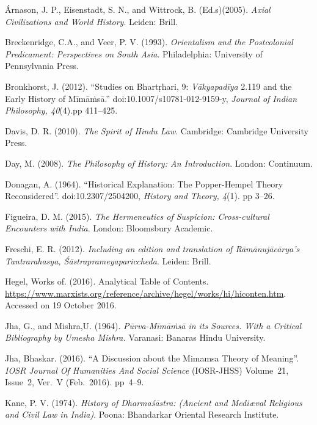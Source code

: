 \begin{thebibliography}{99}
\itemsep=2pt
 Árnason, J. P., Eisenstadt, S. N., and Wittrock, B. (Ed.s)(2005). \textit{Axial Civilizations and World History}. Leiden: Brill.

  Breckenridge, C.A., and Veer, P. V. (1993). \textit{Orientalism and the Postcolonial Predicament: Perspectives on South Asia}. Philadelphia: University of Pennsylvania Press.

  Bronkhorst, J. (2012). “Studies on Bhartṛhari, 9: \textit{Vākyapadīya} 2.119 and the Early History of Mīmāṁsā.” doi:10.1007/s10781-012-9159-y, \textit{Journal of Indian Philosophy, 40}(4).pp 411--425.

  Davis, D. R. (2010). \textit{The Spirit of Hindu Law}. Cambridge: Cambridge University Press.

  Day, M. (2008). \textit{The Philosophy of History: An Introduction}. London: Continuum.

  Donagan, A. (1964). “Historical Explanation: The Popper-Hempel Theory Reconsidered”. doi:10.2307/2504200, \textit{History and Theory, 4}(1). pp 3--26.

  Figueira, D. M. (2015). \textit{The Hermeneutics of Suspicion: Cross-cultural Encounters with India}. London: Bloomsbury Academic.

  Freschi, E. R. (2012). \textit{Including an edition and translation of Rāmānujācārya's Tantrarahasya, Śāstraprameyapariccheda}. Leiden: Brill.

  Hegel, Works of. (2016). Analytical Table of Contents. \url{https://www.marxists.org/reference/archive/hegel/works/hi/hiconten.htm}. Accessed on 19 October 2016.

  Jha, G., and Mishra,U. (1964). \textit{Pūrva-Mīmāṁsā in its Sources. With a Critical Bibliography by Umesha Mishra.} Varanasi: Banaras Hindu University.

  Jha, Bhaskar. (2016). “A Discussion about the Mimamsa Theory of Meaning”. \textit{IOSR Journal Of Humanities And Social Science} (IOSR-JHSS) Volume~21, Issue~2, Ver.~V (Feb.~2016). pp~4--9.

  Kane, P. V. (1974). \textit{History of Dharmaśāstra: (Ancient and Mediæval Religious and Civil Law in India)}. Poona: Bhandarkar Oriental Research Institute.


\end{thebibliography}

